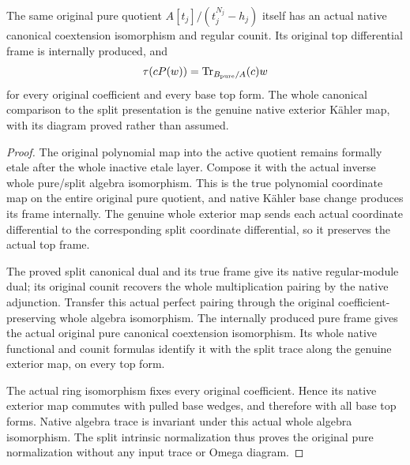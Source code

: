 \begin{theorem}
The same original pure quotient $A[t_j]/(t_j^{N_j}-h_j)$ itself has an
actual native canonical coextension isomorphism and regular counit.
Its original top differential frame is internally produced, and
\[
 \tau(cP(w))=\operatorname{Tr}_{B_{\rm pure}/A}(c)w
\]
for every original coefficient and every base top form.  The whole
canonical comparison to the split presentation is the genuine native
exterior K\"ahler map, with its diagram proved rather than assumed.
\end{theorem}
\begin{proof}
The original polynomial map into the active quotient remains formally
etale after the whole inactive etale layer.  Compose it with the actual
inverse whole pure/split algebra isomorphism.  This is the true polynomial
coordinate map on the entire original pure quotient, and native K\"ahler
base change produces its frame internally.  The genuine whole exterior
map sends each actual coordinate differential to the corresponding
split coordinate differential, so it preserves the actual top frame.

The proved split canonical dual and its true frame give its native
regular-module dual; its original counit recovers the whole multiplication
pairing by the native adjunction.  Transfer this actual perfect pairing
through the original coefficient-preserving whole algebra isomorphism.
The internally produced pure frame gives the actual original pure
canonical coextension isomorphism.  Its whole native functional and
counit formulas identify it with the split trace along the genuine
exterior map, on every top form.

The actual ring isomorphism fixes every original coefficient.  Hence its
native exterior map commutes with pulled base wedges, and therefore with
all base top forms.  Native algebra trace is invariant under this actual
whole algebra isomorphism.  The split intrinsic normalization thus proves
the original pure normalization without any input trace or Omega diagram.
\end{proof}

